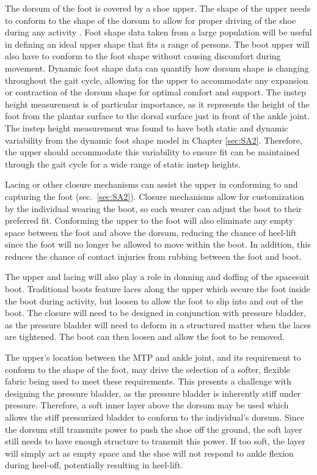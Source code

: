 \documentclass[defaultstyle,11pt]{thesis}
\begin{document}
The dorsum of the foot is covered by a shoe upper.
The shape of the upper needs to conform to the shape of the dorsum to allow for proper driving of the shoe during any activity \citep{Feeney2019}.
Foot shape data taken from a large population will be useful in defining an ideal upper shape that fits a range of persons.
The boot upper will also have to conform to the foot shape without causing discomfort during movement.
Dynamic foot shape data can quantify how dorsum shape is changing throughout the gait cycle, allowing for the upper to accommodate any expansion or contraction of the dorsum shape for optimal comfort and support.
The instep height measurement is of particular importance, as it represents the height of the foot from the plantar surface to the dorsal surface just in front of the ankle joint.
The instep height measurement was found to have both static and dynamic variability from the dynamic foot shape model in Chapter \ref{sec:SA2}.
Therefore, the upper should accommodate this variability to ensure fit can be maintained through the gait cycle for a wide range of static instep heights.

Lacing or other closure mechanisms can assist the upper in conforming to and capturing the foot (sec.~\ref{sec:SA2}).
Closure mechanisms allow for customization by the individual wearing the boot, so each wearer can adjust the boot to their preferred fit.
Conforming the upper to the foot will also eliminate any empty space between the foot and above the dorsum, reducing the chance of heel-lift since the foot will no longer be allowed to move within the boot.
In addition, this reduces the chance of contact injuries from rubbing between the foot and boot.

The upper and lacing will also play a role in donning and doffing of the spacesuit boot.
Traditional boots feature laces along the upper which secure the foot inside the boot during activity, but loosen to allow the foot to slip into and out of the boot.
The closure will need to be designed in conjunction with pressure bladder, as the pressure bladder will need to deform in a structured matter when the laces are tightened.
The boot can then loosen and allow the foot to be removed.

The upper's location between the MTP and ankle joint, and its requirement to conform to the shape of the foot, may drive the selection of a softer, flexible fabric being used to meet these requirements.
This presents a challenge with designing the pressure bladder, as the pressure bladder is inherently stiff under pressure.
Therefore, a soft inner layer above the dorsum may be used which allows the stiff pressurized bladder to conform to the individual's dorsum.
Since the dorsum still transmits power to push the shoe off the ground, the soft layer still needs to have enough structure to transmit this power.
If too soft, the layer will simply act as empty space and the shoe will not respond to ankle flexion during heel-off, potentially resulting in heel-lift.
\end{document}
